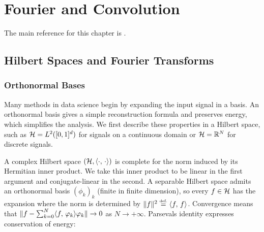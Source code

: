 
\chapter{Fourier and Convolution}
\label{sec-fourier}


The main reference for this chapter is \cite{mallat2008wavelet}.

\newcommand{\piN}{\frac{2\imath\pi}{N}}

\section{Hilbert Spaces and Fourier Transforms}

\subsection{Orthonormal Bases}

Many methods in data science begin by expanding the input signal in a basis. An orthonormal basis gives a simple reconstruction formula and preserves energy, which simplifies the analysis. We first describe these properties in a Hilbert space, such as $\mathcal{H}=L^2([0,1]^d)$ for signals on a continuous domain or $\mathcal{H}=\mathbb{R}^N$ for discrete signals.

A complex Hilbert space $(\mathcal{H},\langle \cdot,\,\cdot\rangle)$ is complete for the norm induced by its Hermitian inner product. We take this inner product to be linear in the first argument and conjugate-linear in the second. A separable Hilbert space admits an orthonormal basis $(\phi_k)_k$ (finite in finite dimension), so every $f\in\mathcal{H}$ has the expansion
where the norm is determined by $\lVert f\rVert^2 \stackrel{\mbox{\upshape\tiny def.}}{=} \langle f,\,f\rangle$. Convergence means that $\lVert f - \sum_{k=0}^N \langle f,\,\varphi_k\rangle \varphi_k \rVert \rightarrow 0$ as $N \rightarrow +\infty$. Parseval\textquotesingle s identity expresses conservation of energy:

